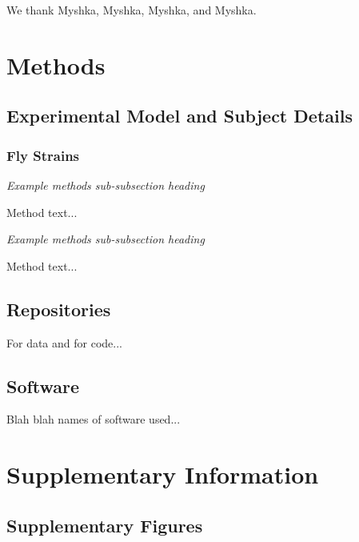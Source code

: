 \documentclass[12pt,letterpaper]{article}
\begin{document}
We thank Myshka, Myshka, Myshka, and Myshka. 


\section{Methods}

\subsection{Experimental Model and Subject Details}

\subsubsection{Fly Strains}

\vspace{0.15in}
\noindent\textit{Example methods sub-subsection heading}
\vspace{0.1in}

Method text...

\vspace{0.15in}
\noindent\textit{Example methods sub-subsection heading}
\vspace{0.1in}

Method text...


\subsection{Repositories}

For data and for code...

\subsection{Software}
 
Blah blah names of software used...

\clearpage



\section{Supplementary Information}

\subsection{Supplementary Figures}
\end{document}
